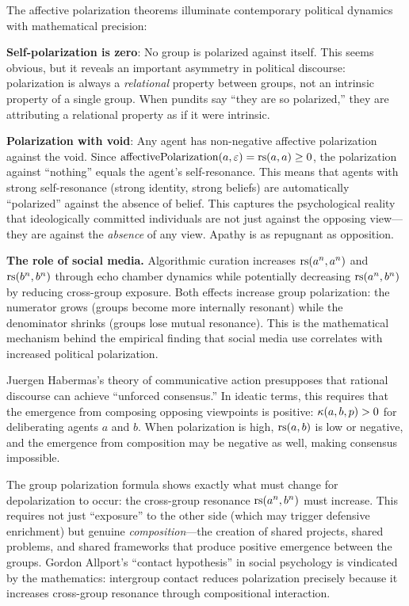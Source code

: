 \begin{interpretation}
The affective polarization theorems illuminate contemporary political dynamics
with mathematical precision:

\textbf{Self-polarization is zero}: No group is polarized against itself. This
seems obvious, but it reveals an important asymmetry in political discourse:
polarization is always a \emph{relational} property between groups, not an
intrinsic property of a single group. When pundits say ``they are so polarized,''
they are attributing a relational property as if it were intrinsic.

\textbf{Polarization with void}: Any agent has non-negative affective polarization
against the void. Since $\mathrm{affectivePolarization}(a, \varepsilon) = \mathrm{rs}(a, a) \geq 0$,
the polarization against ``nothing'' equals the agent's self-resonance. This means
that agents with strong self-resonance (strong identity, strong beliefs) are
automatically ``polarized'' against the absence of belief. This captures the
psychological reality that ideologically committed individuals are not just
against the opposing view---they are against the \emph{absence} of any view.
Apathy is as repugnant as opposition.

\textbf{The role of social media.} Algorithmic curation increases
$\mathrm{rs}(a^n, a^n)$ and $\mathrm{rs}(b^n, b^n)$ through echo chamber dynamics while
potentially decreasing $\mathrm{rs}(a^n, b^n)$ by reducing cross-group exposure. Both
effects increase group polarization: the numerator grows (groups become more
internally resonant) while the denominator shrinks (groups lose mutual resonance).
This is the mathematical mechanism behind the empirical finding that social media
use correlates with increased political polarization.
\end{interpretation}

\begin{remark}
Juergen Habermas's theory of communicative action presupposes that rational
discourse can achieve ``unforced consensus.'' In ideatic terms, this requires
that the emergence from composing opposing viewpoints is positive: $\kappa(a, b, p) > 0$
for deliberating agents $a$ and $b$. When polarization is high, $\mathrm{rs}(a, b)$
is low or negative, and the emergence from composition may be negative as well,
making consensus impossible.

The group polarization formula shows exactly what must change for depolarization
to occur: the cross-group resonance $\mathrm{rs}(a^n, b^n)$ must increase. This requires
not just ``exposure'' to the other side (which may trigger defensive enrichment)
but genuine \emph{composition}---the creation of shared projects, shared problems,
and shared frameworks that produce positive emergence between the groups. Gordon
Allport's ``contact hypothesis'' in social psychology is vindicated by the
mathematics: intergroup contact reduces polarization precisely because it
increases cross-group resonance through compositional interaction.
\end{remark}


